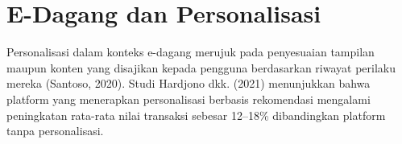 \section{E-Dagang dan Personalisasi}
Personalisasi dalam konteks e-dagang merujuk pada penyesuaian tampilan
maupun konten yang disajikan kepada pengguna berdasarkan riwayat perilaku
mereka (Santoso, 2020). Studi Hardjono dkk. (2021) menunjukkan bahwa
platform yang menerapkan personalisasi berbasis rekomendasi mengalami
peningkatan rata-rata nilai transaksi sebesar 12--18\% dibandingkan
platform tanpa personalisasi.
